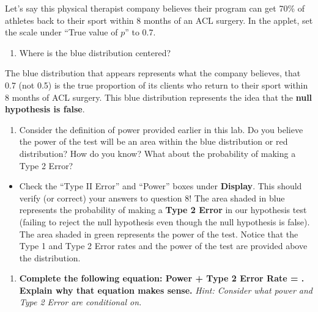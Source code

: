 \documentclass[
]{report}
\providecommand{\tightlist}{%
  \setlength{\itemsep}{0pt}\setlength{\parskip}{0pt}}
\begin{document}
Let's say this physical therapist company believes their program can get 70\% of athletes back to their sport within 8 months of an ACL surgery. In the applet, set the scale under ``True value of \(p\)'' to 0.7.

\begin{enumerate}
\def\labelenumi{\arabic{enumi}.}
\setcounter{enumi}{6}
\tightlist
\item
  Where is the blue distribution centered?
  \vspace{0.25in}
\end{enumerate}

The blue distribution that appears represents what the company believes, that 0.7 (not 0.5) is the true proportion of its clients who return to their sport within 8 months of ACL surgery. This blue distribution represents the idea that the \textbf{null hypothesis is false}.

\begin{enumerate}
\def\labelenumi{\arabic{enumi}.}
\setcounter{enumi}{7}
\tightlist
\item
  Consider the definition of power provided earlier in this lab. Do you believe the power of the test will be an area within the blue distribution or red distribution? How do you know? What about the probability of making a Type 2 Error?
  \vspace{1in}
\end{enumerate}

\begin{itemize}
\tightlist
\item
  Check the ``Type II Error'' and ``Power'' boxes under \textbf{Display}. This should verify (or correct) your answers to question 8! The area shaded in blue represents the probability of making a \textbf{Type 2 Error} in our hypothesis test (failing to reject the null hypothesis even though the null hypothesis is false). The area shaded in green represents the power of the test. Notice that the Type 1 and Type 2 Error rates and the power of the test are provided above the distribution.
\end{itemize}

\begin{enumerate}
\def\labelenumi{\arabic{enumi}.}
\setcounter{enumi}{8}
\tightlist
\item
  \textbf{Complete the following equation: Power + Type 2 Error Rate = . Explain why that equation makes sense.} \emph{Hint: Consider what power and Type 2 Error are conditional on.}
  \vspace{0.6in}
\end{enumerate}
\end{document}
